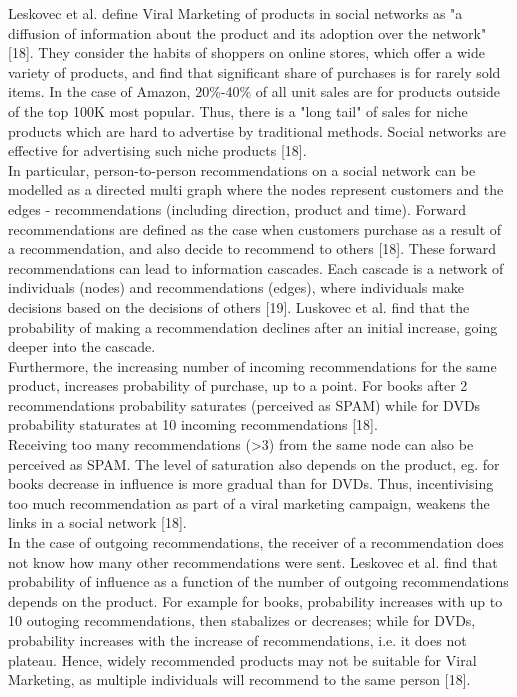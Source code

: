 \documentclass[conference,letterpaper]{IEEEtran}
\begin{document}
Leskovec et al. define Viral Marketing of products in social networks as "a diffusion of information about
the product and its adoption over the network" [18]. They consider the habits of shoppers on online
stores, which offer a wide variety of products, and find that significant share of purchases is for rarely sold items.
In the case of Amazon, 20\%-40\% of all unit sales are for products outside of the top 100K most popular.
Thus, there is a "long tail" of sales for niche products which are hard to advertise by traditional methods.
Social networks are effective for advertising such niche products [18].\\
In particular, person-to-person recommendations on a social network can be modelled as a directed multi
graph where the nodes represent customers and the edges - recommendations (including direction, product and time).
Forward recommendations are defined as the case when customers purchase as a result of a recommendation,
and also decide to recommend to others [18]. These forward recommendations can lead to information cascades.
Each cascade is a network of individuals (nodes) and recommendations (edges), where individuals make
decisions based on the decisions of others [19]. Luskovec et al. find that the probability of making a
recommendation declines after an initial increase, going deeper into the cascade.\\
Furthermore, the increasing number of incoming recommendations for the same product, increases probability
of purchase, up to a point. For books after 2 recommendations probability saturates (perceived as SPAM)
while for DVDs probability staturates at 10 incoming recommendations [18]. \\
Receiving too many recommendations (>3) from the same node can also be perceived as SPAM. The level of
saturation also depends on the product, eg. for books decrease in influence is more gradual than for DVDs.
Thus, incentivising too much recommendation as part of a viral marketing campaign, weakens the links in a social network [18].\\
In the case of outgoing recommendations, the receiver of a recommendation does not know how many other
recommendations were sent. Leskovec et al. find that probability of influence as a function of the number
of outgoing recommendations depends on the product. For example for books, probability increases with up to 
10 outoging recommendations, then stabalizes or decreases; while for DVDs, probability increases with the increase
of recommendations, i.e. it does not plateau. Hence, widely recommended products may not be suitable for Viral
Marketing, as multiple individuals will recommend to the same person [18].\\
\end{document}
